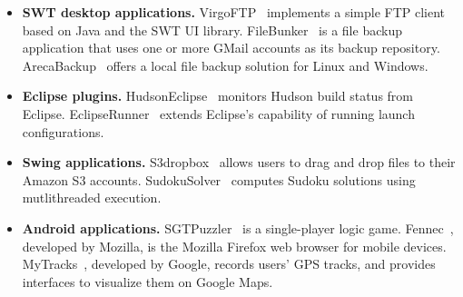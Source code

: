 \begin{itemize}%
\item \textbf{SWT desktop applications.}
VirgoFTP~\cite{virgo} implements a simple FTP client based on Java and the SWT UI library.
FileBunker~\cite{filebunker} is a file backup application that uses one or more GMail
accounts as its backup repository. ArecaBackup~\cite{areca} offers a local
file backup solution for Linux and Windows.


\item \textbf{Eclipse plugins.}
HudsonEclipse~\cite{hudson} monitors Hudson build status from Eclipse.
EclipseRunner~\cite{eclipserunner} extends Eclipse's capability of running launch configurations.


\item \textbf{Swing applications.} %
S3dropbox~\cite{s3dropbox}  allows users
to drag and drop files to their Amazon S3 accounts. SudokuSolver~\cite{sudokusolver}
computes Sudoku solutions using mutlithreaded execution. 


\item  \textbf{Android applications.} %
SGTPuzzler~\cite{sgtpuzzles} is a single-player logic game.
Fennec~\cite{fennec}, developed by Mozilla, is the Mozilla
Firefox web browser for mobile devices. 
MyTracks~\cite{mytracks}, developed by Google, records users' GPS tracks, and provides
interfaces to visualize them on Google Maps. 

\end{itemize}


